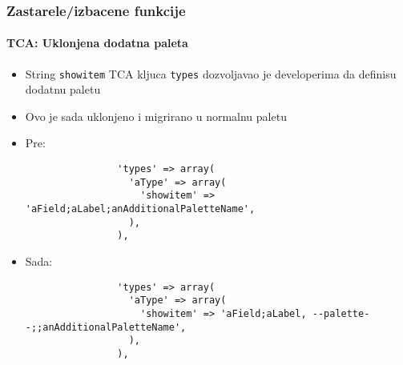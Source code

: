\begin{frame}[fragile]
	\frametitle{Zastarele/izbacene funkcije}
	\framesubtitle{TCA: Uklonjena dodatna paleta}

	\lstset{basicstyle=\tiny\ttfamily}

	\begin{itemize}

		\item String \texttt{showitem} TCA kljuca \texttt{types} dozvoljavao je developerima da definisu dodatnu paletu

		\item Ovo je sada uklonjeno i migrirano u normalnu paletu

		\item Pre:

			\begin{lstlisting}
				'types' => array(
				  'aType' => array(
				    'showitem' => 'aField;aLabel;anAdditionalPaletteName',
				  ),
				),
			\end{lstlisting}

		\item Sada:

			\begin{lstlisting}
				'types' => array(
				  'aType' => array(
				    'showitem' => 'aField;aLabel, --palette--;;anAdditionalPaletteName',
				  ),
				),
			\end{lstlisting}

	\end{itemize}

\end{frame}



